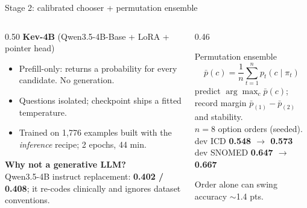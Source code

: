 \documentclass[aspectratio=169,10pt]{beamer}
\newcommand{\hl}[1]{\textcolor{accent}{\textbf{#1}}}
\newcommand{\warnt}[1]{\textcolor{warn}{\textbf{#1}}}
\begin{document}
\begin{frame}{Stage 2: calibrated chooser + permutation ensemble}
\begin{columns}[T]
\begin{column}{0.50\textwidth}
\textbf{Kev-4B} (Qwen3.5-4B-Base + LoRA + pointer head)
\begin{itemize}\setlength\itemsep{1pt}
\item Prefill-only: returns a probability for every candidate. No generation.
\item Questions isolated; checkpoint ships a fitted temperature.
\item Trained on 1{,}776 examples built with the \emph{inference} recipe; 2 epochs, 44 min.
\end{itemize}
\vspace{2mm}
\textbf{Why not a generative LLM?}\\
Qwen3.5-4B instruct replacement: \warnt{0.402 / 0.408}; it re-codes clinically and ignores dataset conventions.
\end{column}
\begin{column}{0.46\textwidth}
\begin{block}{Permutation ensemble}
\[
\bar p(c)=\frac{1}{n}\sum_{t=1}^{n} p_t(c \mid \pi_t)
\]
predict $\arg\max_c \bar p(c)$; record margin $\bar p_{(1)}-\bar p_{(2)}$ and stability.\\[2mm]
$n{=}8$ option orders (seeded).\\[2mm]
dev ICD \hl{0.548 $\rightarrow$ 0.573}\\
dev SNOMED \hl{0.647 $\rightarrow$ 0.667}
\end{block}
{\small\color{muted}Order alone can swing accuracy $\sim$1.4 pts.}
\end{column}
\end{columns}
\end{frame}
\end{document}
